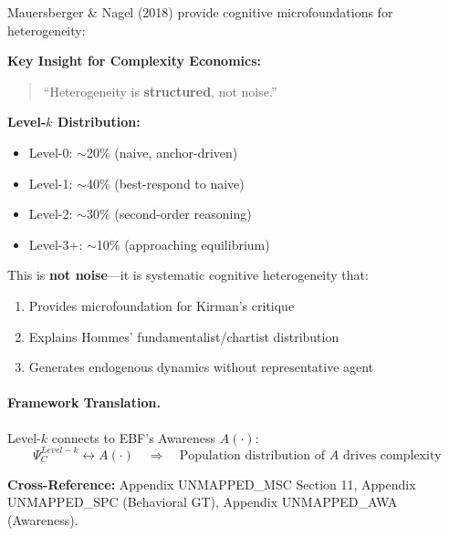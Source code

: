 Mauersberger \& Nagel (2018) provide cognitive microfoundations for heterogeneity:

\begin{tcolorbox}[colback=yellow!5!white, colframe=yellow!75!black,
    title=\textbf{M\&N (2018): Level-$k$ as Structured Heterogeneity}]

\textbf{Key Insight for Complexity Economics:}
\begin{quote}
``Heterogeneity is \textbf{structured}, not noise.''
\end{quote}

\textbf{Level-$k$ Distribution:}
\begin{itemize}[nosep]
    \item Level-0: $\sim$20\% (naive, anchor-driven)
    \item Level-1: $\sim$40\% (best-respond to naive)
    \item Level-2: $\sim$30\% (second-order reasoning)
    \item Level-3+: $\sim$10\% (approaching equilibrium)
\end{itemize}

This is \textbf{not noise}---it is systematic cognitive heterogeneity that:
\begin{enumerate}[nosep]
    \item Provides microfoundation for Kirman's critique
    \item Explains Hommes' fundamentalist/chartist distribution
    \item Generates endogenous dynamics without representative agent
\end{enumerate}

\end{tcolorbox}

\paragraph{Framework Translation.}
Level-$k$ connects to EBF's Awareness $A(\cdot)$:
\begin{equation}
\Psi_C^{Level-k} \leftrightarrow A(\cdot) \quad \Rightarrow \quad
\text{Population distribution of } A \text{ drives complexity}
\end{equation}

\textbf{Cross-Reference:} Appendix UNMAPPED_MSC Section 11, Appendix UNMAPPED_SPC (Behavioral GT),
Appendix UNMAPPED_AWA (Awareness).

